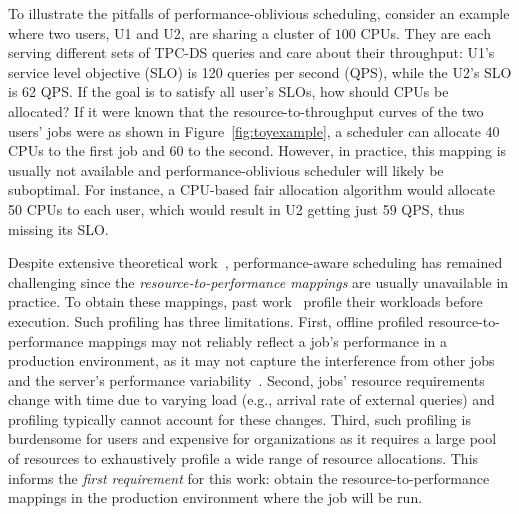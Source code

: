 To illustrate the pitfalls of performance-oblivious scheduling,
consider an example where two users, U1 and U2, are sharing a cluster of $100$ CPUs.
They are each serving different sets of TPC-DS\cite{tpc-ds} queries and care about their throughput:
 U1's service level objective (SLO) is 120 queries per second (QPS),
while the U2's SLO is 62 QPS.
If the goal is to satisfy all user's SLOs, how should CPUs be allocated? 
If it were known that the resource-to-throughput curves of the two users' jobs were as shown
in Figure~\ref{fig:toyexample},
a scheduler can allocate 40 CPUs to the first job and 60 to the second.
However, in practice, this  mapping is usually not available
and performance-oblivious scheduler will likely be suboptimal.
For instance, a CPU-based fair allocation algorithm would allocate 50 CPUs to each user, which would result in U2 getting just 59 QPS, thus missing its SLO.

Despite extensive theoretical
work~\cite{demers1989analysis,ghodsi2011dominant,kaneko1979nash,kelly1998rate,gutman2012fair},
performance-aware scheduling has remained challenging since %
the \emph{resource-to-performance mappings} are usually unavailable in practice.
To obtain these mappings, past work~\cite{venkataraman2016ernest,delimitrou2014quasar,zhang2021sinan}
 profile their workloads before execution. Such profiling has three limitations.
First, offline profiled resource-to-performance mappings
 may not reliably reflect a job's performance in a production
environment,
as it may not capture the interference from other jobs~\cite{delimitrou2013paragon}
and the server's performance variability~\cite{tailatscale}.
Second, jobs' resource requirements change with time due to varying load (e.g., arrival rate
of external queries) and profiling typically cannot account for these
changes. 
Third, such profiling is burdensome 
for users and expensive for organizations as 
it requires a large pool of  resources to
exhaustively profile a wide range of resource allocations.
This informs the \emph{first requirement} for this work: obtain the resource-to-performance mappings in the production environment where the job will be run.



